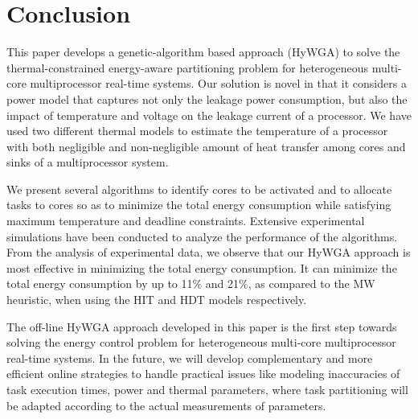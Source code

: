 \documentclass[conference]{IEEEtran}
\begin{document}
\section{Conclusion}


This paper develops a genetic-algorithm based approach (HyWGA) to solve the thermal-constrained energy-aware partitioning problem for heterogeneous multi-core multiprocessor real-time systems.
Our solution is novel in that it considers a power model that captures not only the leakage power consumption, but also the impact of temperature and voltage on the leakage current of a processor. We have used two different thermal models to estimate the temperature of a processor with both negligible and non-negligible amount of heat transfer among cores and sinks of a multiprocessor system. 

We present several algorithms to identify cores to be activated and to allocate tasks to cores so as to minimize 
the total energy consumption while satisfying maximum temperature and deadline constraints. Extensive experimental simulations have been conducted to analyze the performance of the algorithms. From the analysis of experimental data, we observe that our HyWGA approach is most effective in minimizing the total energy consumption. It can minimize the total energy consumption by up to 11\% and 21\%, as compared to the %
MW heuristic, when using the HIT and HDT models respectively.

The off-line HyWGA approach developed in this paper is the first step towards solving the energy control problem for heterogeneous multi-core multiprocessor real-time systems. In the future, we will develop complementary and more efficient online strategies to handle practical issues like modeling inaccuracies of task execution times, power and thermal parameters, where task partitioning will be adapted according to the actual measurements of parameters. 







%
\end{document}
